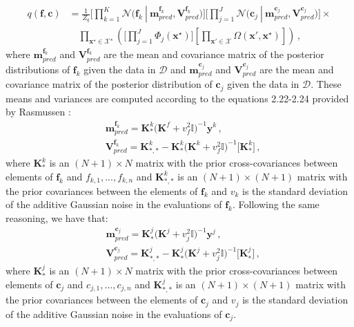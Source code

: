 \documentclass[review,preprint,12pt]{elsarticle}
\begin{document}
\begin{align}
q(\boldsymbol{f},\boldsymbol{c}) & = \frac{1}{Z_q} \bigg[\prod_{k=1}^{K}\mathcal{N}\big(\boldsymbol{f}_k\ |\  \boldsymbol{m}_{pred}^{\boldsymbol{f}_k}, \boldsymbol{V}_{pred}^{\boldsymbol{f}_k}\big)\bigg] \bigg[\prod_{j=1}^{J}\mathcal{N}\big(\boldsymbol{c}_j\ |\  \boldsymbol{m}_{pred}^{\boldsymbol{c}_j}, \boldsymbol{V}_{pred}^{\boldsymbol{c}_j}\big)\bigg] \times \nonumber
\\
	& \quad \prod_{\textbf{x}^\star\in \mathcal{X}^\star} 
	\left(
	\Bigg[\prod_{j=1}^{J}\Phi_j(\textbf{x}^{\star})\Bigg]
	\left[ 
	\prod_{\textbf{x}'\in \mathcal{X}} 
	\Omega(\textbf{x}',\textbf{x}^{\star})
	\right]	
	\right)\,,
\end{align}
where $\boldsymbol{m}_{pred}^{\boldsymbol{f}_k}$ and $\boldsymbol{V}_{pred}^{\boldsymbol{f}_k}$ are the mean and covariance matrix of the posterior distributions of $\boldsymbol{f}_k$ given the data in $\mathcal{D}$ and $\boldsymbol{m}_{pred}^{\boldsymbol{c}_j}$ and $\boldsymbol{V}_{pred}^{\boldsymbol{c}_j}$ are the mean and covariance matrix of the posterior distribution of $\boldsymbol{c}_j$ given the data in $\mathcal{D}$. These means and variances are computed according to the equations 2.22-2.24 provided by Rasmussen \citep{rasmussen2006gaussian}:
\begin{align}
    &
    \boldsymbol{m}_{pred}^{\boldsymbol{f}_{k}} = \boldsymbol{K}_{*}^{k}\big(\boldsymbol{K}^{f} + v_{f}^{2}        \mathds{I}\big)^{-1}\boldsymbol{y}^k\,, \nonumber \\
    & 
    \boldsymbol{V}_{pred}^{\boldsymbol{f}_{k}} = \boldsymbol{K}_{*,*}^{k} - \boldsymbol{K}_{*}^{k}\big(\boldsymbol{K}^{k} + v_{f}^{2}        \mathds{I}\big)^{-1}\big[\boldsymbol{K}_{*}^{k}\big]\,,
\end{align}
where $\boldsymbol{K}_{*}^{k}$ is an $(N + 1) \times N$ matrix with the prior cross-covariances between elements of $\boldsymbol{f}_k$ and $f_{k,1},...,f_{k,n}$ and $\boldsymbol{K}_{*,*}^{k}$ is an $(N + 1) \times (N + 1)$ matrix with the prior covariances between the elements of $\boldsymbol{f}_k$ and $v_k$ is the standard deviation of the additive Gaussian noise in the evaluations of $\boldsymbol{f}_k$. Following the same reasoning, we have that: 
\begin{align}
    &
    \boldsymbol{m}_{pred}^{\boldsymbol{c}_{j}} = \boldsymbol{K}_{*}^{j}\big(\boldsymbol{K}^{j} + v_{j}^{2}        \mathds{I}\big)^{-1}\boldsymbol{y}^j\,, \nonumber \\
    & 
    \boldsymbol{V}_{pred}^{\boldsymbol{c}_{j}} = \boldsymbol{K}_{*,*}^{j} - \boldsymbol{K}_{*}^{j}\big(\boldsymbol{K}^{j} + v_{j}^{2}        \mathds{I}\big)^{-1}\big[\boldsymbol{K}_{*}^{j}\big]\,,
\end{align}
where $\boldsymbol{K}_{*}^{j}$ is an $(N + 1) \times N$ matrix with the prior cross-covariances between elements of $\boldsymbol{c}_j$ and $c_{j,1},...,c_{j,n}$ and $\boldsymbol{K}_{*,*}^{j}$ is an $(N + 1) \times (N + 1)$ matrix with the prior covariances between the elements of $\boldsymbol{c}_j$ and $v_j$ is the standard deviation of the additive Gaussian noise in the evaluations of $\boldsymbol{c}_j$.
\end{document}
